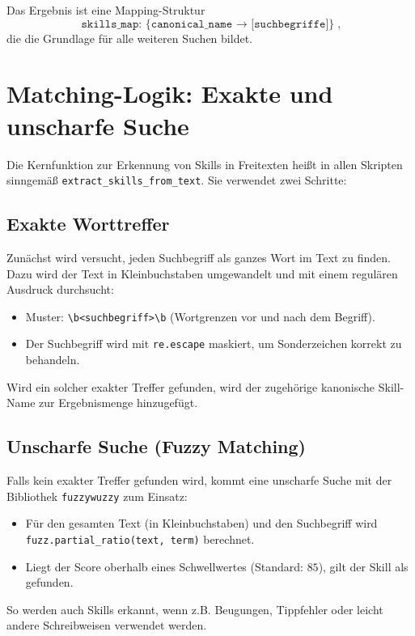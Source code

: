 \documentclass[12pt,a4paper]{article}
\begin{document}
Das Ergebnis ist eine Mapping-Struktur
\[
\texttt{skills\_map: \{canonical\_name $\to$ [suchbegriffe]\}},
\]
die die Grundlage für alle weiteren Suchen bildet.

\section{Matching-Logik: Exakte und unscharfe Suche}

Die Kernfunktion zur Erkennung von Skills in Freitexten heißt in allen Skripten sinngemäß
\texttt{extract\_skills\_from\_text}. Sie verwendet zwei Schritte:

\subsection{Exakte Worttreffer}

Zunächst wird versucht, jeden Suchbegriff als ganzes Wort im Text zu finden. Dazu wird der
Text in Kleinbuchstaben umgewandelt und mit einem regulären Ausdruck durchsucht:
\begin{itemize}
    \item Muster: \verb|\b<suchbegriff>\b| (Wortgrenzen vor und nach dem Begriff).
    \item Der Suchbegriff wird mit \verb|re.escape| maskiert, um Sonderzeichen korrekt zu behandeln.
\end{itemize}

Wird ein solcher exakter Treffer gefunden, wird der zugehörige kanonische Skill-Name zur
Ergebnismenge hinzugefügt.

\subsection{Unscharfe Suche (Fuzzy Matching)}

Falls kein exakter Treffer gefunden wird, kommt eine unscharfe Suche mit der Bibliothek
\texttt{fuzzywuzzy} zum Einsatz:
\begin{itemize}
    \item Für den gesamten Text (in Kleinbuchstaben) und den Suchbegriff wird
          \verb|fuzz.partial_ratio(text, term)| berechnet.
    \item Liegt der Score oberhalb eines Schwellwertes (Standard: \(85\)),
          gilt der Skill als gefunden.
\end{itemize}

So werden auch Skills erkannt, wenn z.B. Beugungen, Tippfehler oder leicht andere Schreibweisen
verwendet werden.
\end{document}
